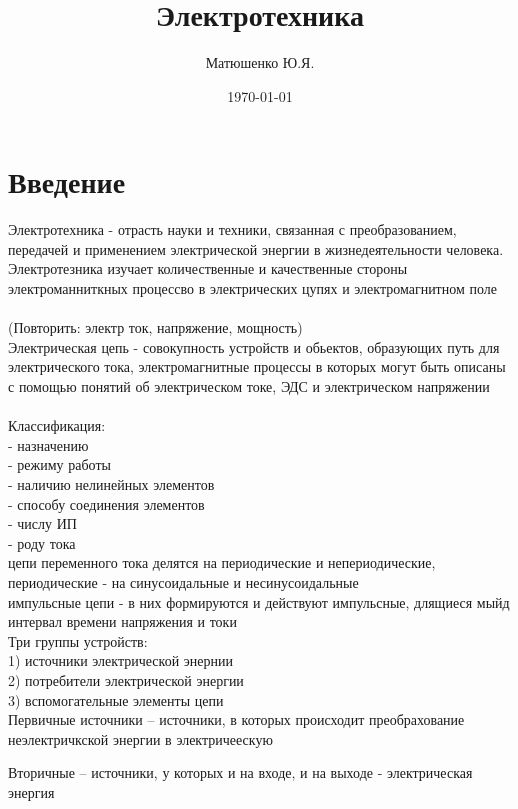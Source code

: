 \documentclass[a4paper, 12pt]{article}
\title{Электротехника}
\author{Матюшенко Ю.Я.}
\date{\today}
\begin{document}
\sffamily
\maketitle
\section{Введение}
Электротехника - отрасть науки и техники, связанная с преобразованием, передачей и применением электрической энергии в жизнедеятельности человека.\\

Электротезника изучает количественные и качественные стороны электроманниткных процессво в электрических цупях и электромагнитном поле\\ \\
(Повторить: электр ток, напряжение, мощность)\\ 

Электрическая цепь - совокупность устройств и обьектов, образующих путь для электрического тока, электромагнитные процессы в которых могут быть описаны с помощью понятий об электрическом токе, ЭДС и электрическом напряжении\\
\\
Классификация:\\
- назначению\\
- режиму работы\\
- наличию нелинейных элементов\\
- способу соединения элементов\\
- числу ИП\\
- роду тока\\

цепи переменного тока делятся на периодические и непериодические, периодические - на синусоидальные и несинусоидальные\\
импульсные цепи - в них формируются и действуют импульсные, длящиеся мыйд интервал времени напряжения и токи\\

Три группы устройств:\\
1) источники электрической энернии\\
2) потребители электрической энергии\\ 
3) вспомогательные элементы цепи\\

Первичные источники -- источники, в которых происходит преобрахование неэлектричкской энергии в электричеескую

Вторичные -- источники, у которых и на входе, и на выходе - электрическая энергия\\
\end{document}
